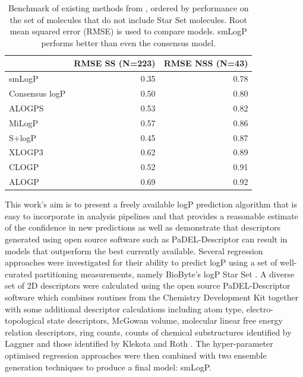 \documentclass[10pt]{bmc_article}
\newenvironment{bmcformat}{\begin{raggedright}\baselineskip20pt\sloppy\setboolean{publ}{false}}{\end{raggedright}\baselineskip20pt\sloppy}
\begin{document}
\begin{bmcformat}
\begin{table}[htbp]
  \centering
  \caption{Benchmark of existing methods from \cite{mannhold_calculation_2009}, ordered by performance on the set of molecules that do not include Star Set molecules. Root mean squared error (RMSE) is used to compare models. smLogP performs better than even the consensus model.}
    \begin{tabular}{lrr}
    \toprule
          & RMSE SS (N=223) & RMSE NSS (N=43) \\
    \midrule
    smLogP & 0.35 & 0.78 \\
    Consensus logP & 0.50 & 0.80 \\
    ALOGPS  & 0.53  & 0.82 \\
    MiLogP  & 0.57  & 0.86 \\
    S+logP  & 0.45  & 0.87 \\
    XLOGP3  & 0.62  & 0.89 \\
    CLOGP  & 0.52  & 0.91 \\
    ALOGP  & 0.69  & 0.92 \\
    \bottomrule
    \end{tabular}%
  \label{tab:old_method_comp}%
\end{table}%

This work's aim is to present a freely available logP prediction algorithm that is easy to incorporate in analysis pipelines and that provides a reasonable estimate of the confidence in new predictions as well as demonstrate that descriptors generated using open source software such as PaDEL-Descriptor \cite{yap_padel-descriptor:_2011} can result in models that outperform the best currently available. Several regression approaches were investigated for their ability to predict logP using a set of well-curated partitioning measurements, namely BioByte's logP Star Set \cite{leo_partition_1971}. A diverse set of 2D descriptors were calculated using the open source PaDEL-Descriptor software \cite{yap_padel-descriptor:_2011} which combines routines from the Chemistry Development Kit \cite{steinbeck_chemistry_2003} together with some additional descriptor calculations including atom type, electro-topological state descriptors, McGowan volume, molecular linear free energy relation descriptors, ring counts, counts of chemical substructures identified by Laggner \cite{laggner_2009} and those identified by Klekota and Roth \cite{klekota_chemical_2008}. The hyper-parameter optimised regression approaches were then combined with two ensemble generation techniques to produce a final model: smLogP. 


\end{bmcformat}
\end{document}
